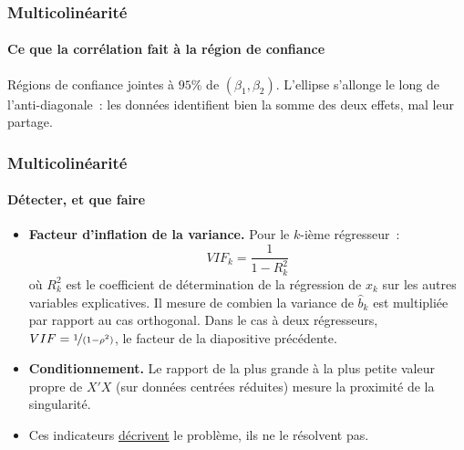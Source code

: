 \documentclass[10pt]{beamer}
\begin{document}
\begin{frame}[c]
  \frametitle{Multicolinéarité}
  \framesubtitle{Ce que la corrélation fait à la région de confiance}

  \begin{center}
    \scalebox{.62}{}
  \end{center}

  \medskip

  {\small Régions de confiance jointes à $95\%$ de $(\beta_1,\beta_2)$. L'ellipse
    s'allonge le long de l'anti-diagonale~: les données identifient bien la somme des
    deux effets, mal leur partage.}

\end{frame}


\begin{frame}
  \frametitle{Multicolinéarité}
  \framesubtitle{Détecter, et que faire}

  \begin{itemize}

  \item \textbf{Facteur d'inflation de la variance.} Pour le $k$-ième régresseur~:
    \[
      VIF_k = \frac{1}{1-R_k^2}
    \]
    où $R_k^2$ est le coefficient de détermination de la régression de $x_k$ sur les
    autres variables explicatives. Il mesure de combien la variance de $\hat b_k$ est
    multipliée par rapport au cas orthogonal. Dans le cas à deux régresseurs,
    $VIF = \nicefrac{1}{(1-\rho^2)}$, le facteur de la diapositive précédente.\newline

  \item \textbf{Conditionnement.} Le rapport de la plus grande à la plus petite valeur
    propre de $X'X$ (sur données centrées réduites) mesure la proximité de la
    singularité.\newline

  \item[$\Rightarrow$] Ces indicateurs \underline{décrivent} le problème, ils ne le
    résolvent pas.

  \end{itemize}

\end{frame}
\end{document}
